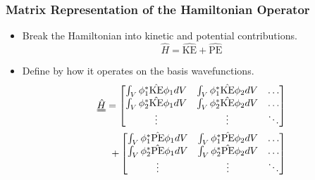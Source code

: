 \documentclass[]{beamer}
\begin{document}
\begin{frame}
  \frametitle{Matrix Representation of the Hamiltonian Operator}  
  
  \begin{itemize}
  \item<1-> Break the Hamiltonian into kinetic and potential contributions.
  \begin{equation*}
  \hat{H} = \hat{\mathrm{KE}} + \hat{\mathrm{PE}}
  \end{equation*}
  \item<2-> Define by how it operates on the basis wavefunctions.
  \begin{eqnarray*}
   \uuline{\hat{H}} = \begin{bmatrix}
        \int_V \phi_{1} ^* \hat{\mathrm{KE}} \phi_{1} dV &  \int_V \phi_{1} ^* \hat{\mathrm{KE}} \phi_{2} dV  & \ldots \\
            \int_V \phi_{2} ^* \hat{\mathrm{KE}} \phi_{1} dV  &  \int_V \phi_{2} ^* \hat{\mathrm{KE}} \phi_{2} dV & \ldots \\
            \vdots & \vdots & \ddots \\
        \end{bmatrix}\\+ \begin{bmatrix}
      \int_V \phi_{1} ^* \hat{\mathrm{PE}} \phi_{1} dV &  \int_V \phi_{1} ^* \hat{\mathrm{PE}} \phi_{2} dV  & \ldots \\
          \int_V \phi_{2} ^* \hat{\mathrm{PE}} \phi_{1} dV  &  \int_V \phi_{2} ^* \hat{\mathrm{PE}} \phi_{2} dV & \ldots \\
          \vdots & \vdots & \ddots \\
      \end{bmatrix}
  \end{eqnarray*}



  \end{itemize}
\end{frame}
\end{document}
